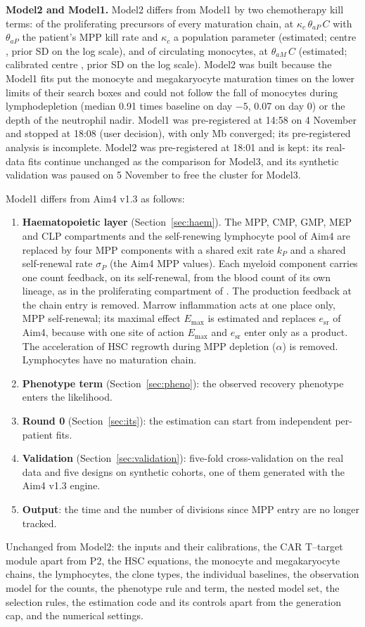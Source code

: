 \documentclass[11pt]{article}
\begin{document}
\textbf{Model2 and Model1.} Model2 differs from Model1 by two chemotherapy kill terms: of the proliferating precursors of every maturation chain, at $\kappa_c\,\theta_{aP}\,C$ with $\theta_{aP}$ the patient's MPP kill rate and $\kappa_c$ a population parameter (estimated; centre \valKappaC, prior SD \valKappaCSd{} on the log scale), and of circulating monocytes, at $\theta_{aM}\,C$ (estimated; calibrated centre \valThAm, prior SD \valThAmSd{} on the log scale). Model2 was built because the Model1 fits put the monocyte and megakaryocyte maturation times on the lower limits of their search boxes and could not follow the fall of monocytes during lymphodepletion (median 0.91 times baseline on day $-5$, 0.07 on day 0) or the depth of the neutrophil nadir. Model1 was pre-registered at 14:58 on 4 November and stopped at 18:08 (user decision), with only Mb converged; its pre-registered analysis is incomplete. Model2 was pre-registered at 18:01 and is kept: its real-data fits continue unchanged as the comparison for Model3, and its synthetic validation was paused on 5 November to free the cluster for Model3.

Model1 differs from Aim4 v1.3 as follows:
\begin{enumerate}
\item \textbf{Haematopoietic layer} (Section~\ref{sec:haem}). The MPP, CMP, GMP, MEP and CLP compartments and the self-renewing lymphocyte pool of Aim4 are replaced by four MPP components with a shared exit rate $k_P$ and a shared self-renewal rate $\sigma_P$ (the Aim4 MPP values). Each myeloid component carries one count feedback, on its self-renewal, from the blood count of its own lineage, as in the proliferating compartment of \citet{friberg2002}. The production feedback at the chain entry is removed. Marrow inflammation acts at one place only, MPP self-renewal; its maximal effect $E_{\max}$ is estimated and replaces $e_{\mathrm{sr}}$ of Aim4, because with one site of action $E_{\max}$ and $e_{\mathrm{sr}}$ enter only as a product. The acceleration of HSC regrowth during MPP depletion ($\alpha$) is removed. Lymphocytes have no maturation chain.
\item \textbf{Phenotype term} (Section~\ref{sec:pheno}): the observed recovery phenotype enters the likelihood.
\item \textbf{Round 0} (Section~\ref{sec:its}): the estimation can start from independent per-patient fits.
\item \textbf{Validation} (Section~\ref{sec:validation}): five-fold cross-validation on the real data and five designs on synthetic cohorts, one of them generated with the Aim4 v1.3 engine.
\item \textbf{Output}: the time and the number of divisions since MPP entry are no longer tracked.
\end{enumerate}
Unchanged from Model2: the inputs and their calibrations, the CAR T--target module apart from P2, the HSC equations, the monocyte and megakaryocyte chains, the lymphocytes, the clone types, the individual baselines, the observation model for the counts, the phenotype rule and term, the nested model set, the selection rules, the estimation code and its controls apart from the generation cap, and the numerical settings.
\end{document}
